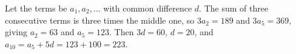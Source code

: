 Let the terms be $a_1,a_2,\dots$ with common difference $d$. The sum of three consecutive terms is three times the middle one, so $3a_2=189$ and $3a_5=369$, giving $a_2=63$ and $a_5=123$. Then $3d=60$, $d=20$, and $a_{10}=a_5+5d=123+100=\boxed{223}$.
